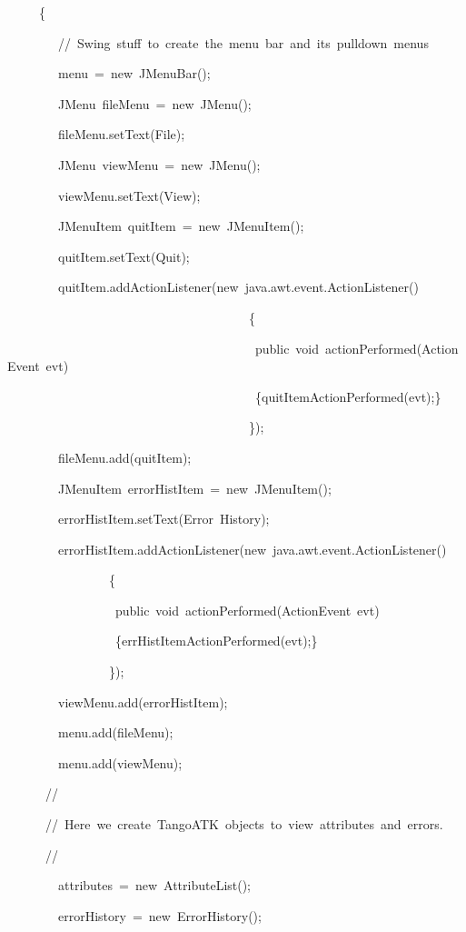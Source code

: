 \begin{lyxcode}
~~~~~\{

~~~~~~~~//~Swing~stuff~to~create~the~menu~bar~and~its~pulldown~menus

~~~~~~~~menu~=~new~JMenuBar();

~~~~~~~~JMenu~fileMenu~=~new~JMenu();

~~~~~~~~fileMenu.setText(\textquotedbl{}File\textquotedbl{});~~~

~~~~~~~~JMenu~viewMenu~=~new~JMenu();

~~~~~~~~viewMenu.setText(\textquotedbl{}View\textquotedbl{});

~~~~~~~~JMenuItem~quitItem~=~new~JMenuItem();

~~~~~~~~quitItem.setText(\textquotedbl{}Quit\textquotedbl{});

~~~~~~~~quitItem.addActionListener(new~java.awt.event.ActionListener()

~~~~~~~~~~~~~~~~~~~~~~~~~~~~~~~~~~~~~~\{~~~~~~~~~~~~~~~~~

~~~~~~~~~~~~~~~~~~~~~~~~~~~~~~~~~~~~~~~public~void~actionPerformed(ActionEvent~evt)

~~~~~~~~~~~~~~~~~~~~~~~~~~~~~~~~~~~~~~~\{quitItemActionPerformed(evt);\}

~~~~~~~~~~~~~~~~~~~~~~~~~~~~~~~~~~~~~~\});

~~~~~~~~fileMenu.add(quitItem);

~~~~~~~~JMenuItem~errorHistItem~=~new~JMenuItem();

~~~~~~~~errorHistItem.setText(\textquotedbl{}Error~History\textquotedbl{});

~~~~~~~~errorHistItem.addActionListener(new~java.awt.event.ActionListener()

~~~~~~~~~~~~~~~~\{~~~~~~~~~~~~~~~~~

~~~~~~~~~~~~~~~~~public~void~actionPerformed(ActionEvent~evt)

~~~~~~~~~~~~~~~~~\{errHistItemActionPerformed(evt);\}

~~~~~~~~~~~~~~~~\});

~~~~~~~~viewMenu.add(errorHistItem);

~~~~~~~~menu.add(fileMenu);

~~~~~~~~menu.add(viewMenu);

~~~~~~//

~~~~~~//~Here~we~create~TangoATK~objects~to~view~attributes~and~errors.

~~~~~~//

~~~~~~~~attributes~=~new~AttributeList();~

~~~~~~~~errorHistory~=~new~ErrorHistory();


\end{lyxcode}
